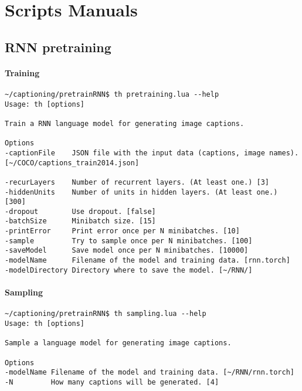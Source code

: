 \chapter{Scripts Manuals}

\section{RNN pretraining}

\subsubsection{Training}

\begin{lstlisting}[firstnumber=1,breakindent=75pt]
~/captioning/pretrainRNN$ th pretraining.lua --help  
Usage: th [options] 

Train a RNN language model for generating image captions.

Options
-captionFile    JSON file with the input data (captions, image names). [~/COCO/captions_train2014.json]

-recurLayers    Number of recurrent layers. (At least one.) [3]
-hiddenUnits    Number of units in hidden layers. (At least one.) [300]
-dropout        Use dropout. [false]
-batchSize      Minibatch size. [15]
-printError     Print error once per N minibatches. [10]
-sample         Try to sample once per N minibatches. [100]
-saveModel      Save model once per N minibatches. [10000]
-modelName      Filename of the model and training data. [rnn.torch]
-modelDirectory Directory where to save the model. [~/RNN/]
\end{lstlisting}
\hspace{1cm}

\subsubsection{Sampling}

\begin{lstlisting}[firstnumber=1,breakindent=75pt]
~/captioning/pretrainRNN$ th sampling.lua --help
Usage: th [options] 

Sample a language model for generating image captions.

Options
-modelName Filename of the model and training data. [~/RNN/rnn.torch]
-N         How many captions will be generated. [4]
\end{lstlisting}
\hspace{1cm}

